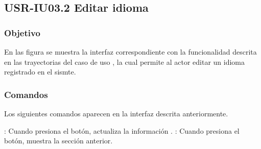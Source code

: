 \clearpage
\subsection{USR-IU03.2 Editar idioma}

\subsubsection{Objetivo}
En las figura  se muestra la interfaz correspondiente con la funcionalidad descrita en las
trayectorias del caso de uso  , la cual permite al actor editar un idioma registrado en el sismte.

\subsubsection{Comandos}
Los siguientes comandos aparecen en la interfaz descrita anteriormente.

\Titem {} : Cuando presiona el botón, actualiza la información .
\Titem {} : Cuando presiona el botón, muestra la sección anterior.%



\clearpage
